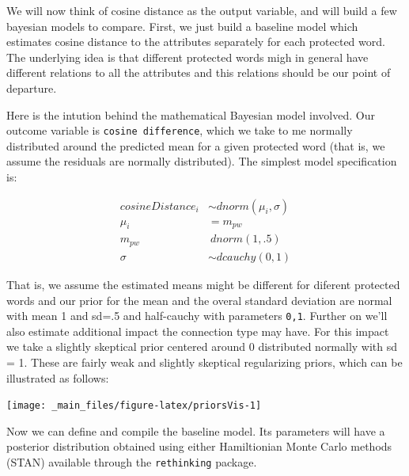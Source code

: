 \documentclass[12pt,]{book}
\begin{document}
We will now think of cosine distance as the output variable, and will
build a few bayesian models to compare. First, we just build a baseline
model which estimates cosine distance to the attributes separately for
each protected word. The underlying idea is that different protected
words migh in general have different relations to all the attributes and
this relations should be our point of departure.

Here is the intution behind the mathematical Bayesian model involved.
Our outcome variable is \texttt{cosine\ difference}, which we take to me
normally distributed around the predicted mean for a given protected
word (that is, we assume the residuals are normally distributed). The
simplest model specification is:

\begin{align}
cosineDistance_i  & \sim dnorm(\mu_i, \sigma) \\
\mu_i & = m_{pw} \\
m_{pw} & ~ dnorm(1,.5) \\
\sigma &\sim  dcauchy(0,1)
\end{align}

That is, we assume the estimated means might be different for diferent
protected words and our prior for the mean and the overal standard
deviation are normal with mean 1 and sd=.5 and half-cauchy with
parameters \texttt{0,1}. Further on we'll also estimate additional
impact the connection type may have. For this impact we take a slightly
skeptical prior centered around 0 distributed normally with sd = 1.
These are fairly weak and slightly skeptical regularizing priors, which
can be illustrated as follows:

\vspace{2mm}

\begin{center}\texttt{[image: \_main\_files/figure-latex/priorsVis-1]} \end{center}

Now we can define and compile the baseline model. Its parameters will
have a posterior distribution obtained using either Hamiltionian Monte
Carlo methods (STAN) available through the \texttt{rethinking} package.

\vspace{1mm} \footnotesize
\end{document}
